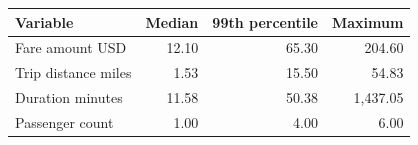 \begin{tabular}{lrrr}
\toprule
Variable & Median & 99th percentile & Maximum \\
\midrule
Fare amount USD & 12.10 & 65.30 & 204.60 \\
Trip distance miles & 1.53 & 15.50 & 54.83 \\
Duration minutes & 11.58 & 50.38 & 1,437.05 \\
Passenger count & 1.00 & 4.00 & 6.00 \\
\bottomrule
\end{tabular}
